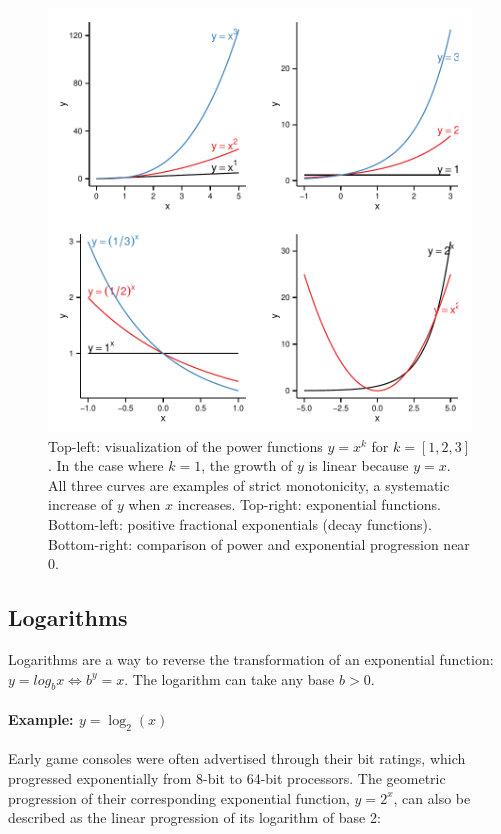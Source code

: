 \begin{knitrout}
\color{fgcolor}\begin{figure}[]

\includegraphics[width=\linewidth]{images/math-exps-and-powers} \caption{Top-left: visualization of the power functions $y = x^k$ for $k = [1,2,3]$. In the case where $k = 1$, the growth of $y$ is linear because $y = x$. All three curves are examples of strict monotonicity, \ie a systematic increase of $y$ when $x$ increases. Top-right: exponential functions. Bottom-left: positive fractional exponentials (decay functions). Bottom-right: comparison of power and exponential progression near $0$.\label{fig:exps-and-powers}}
\end{figure}


\end{knitrout}


%
%
\subsection{Logarithms}

Logarithms are a way to reverse the transformation of an exponential function: $y = log_b x \iff b^y = x$. The logarithm can take any base $b > 0$.

%
\paragraph{Example: $y = \log_2(x)$} %
%
Early game consoles were often advertised through their bit ratings, which progressed exponentially from 8-bit to 64-bit processors. The geometric progression of their corresponding exponential function, $y = 2^x$, can also be described as the linear progression of its logarithm of base 2:

